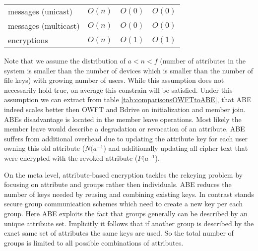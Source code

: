 \begin{table*}[!ht]
\begin{tabular}{l 		| l 						| l 						| l }
messages (unicast)		& $O(n)$	 				& $O(0)$					& $O(0)$			\\
messages (multicast)	& $O(n)$ 					& $O(0)$ 					& $O(0)$			\\
encryptions				& $O(n)$ 					& $O(1)$					& $O(1)$			\\
\hline
\end{tabular}
\caption{Comparison of Bdrive, \ac{GKMP} and \ac{ABE} scheme. $n$ donating the number of members, $N$ the number of all users in the system, $f$ the number of file keys in the group, $F$ the number of all filekeys, $a$ the number of attributes used for this group, $A$ all attributes }
\label{tab:comparisonsOWFTtoABE}
\end{table*}

Note that we assume the distribution of $a < n < f$ (number of attributes in the system is smaller than the number of devices which is smaller than the number of file keys) with growing number of users. While this assumption does not necessarily hold true, on average this constrain will be satisfied. Under this assumption we can extract from table \ref{tab:comparisonsOWFTtoABE}, that \ac{ABE} indeed scales better then \ac{OWFT} and Bdrive on initialization and member join. ABEs disadvantage is located in the member leave operations. Most likely the member leave would describe a degradation or revocation of an attribute. \ac{ABE} suffers from additional overhead due to updating the attribute key for each user owning this old attribute ($N(a^{-1}$) and additionally updating all cipher text that were encrypted with the revoked attribute ($F(a^{-1}$).

On the meta level, attribute-based encryption tackles the rekeying problem by focusing on attribute and groups rather then individuals. \ac{ABE} reduces the number of keys needed by reusing and combining existing keys. In contrast stands secure group communication schemes which need to create a new key per each group. Here \ac{ABE} exploits the fact that groups generally can be described by an unique attribute set. Implicitly it follows that if another group is described by the exact same set of attributes the same keys are used. So the total number of groups is limited to all possible combinations of attributes. 


